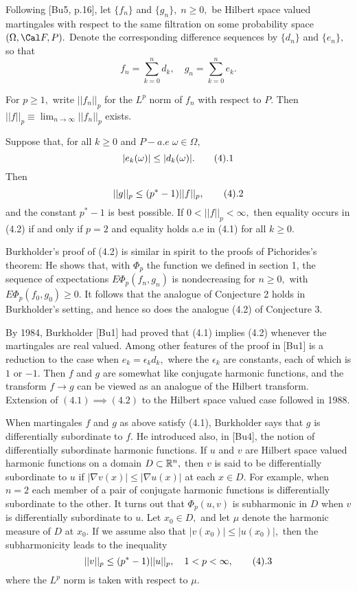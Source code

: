 Following [Bu5, p.16], let $\{f_n\}$ and $\{g_n\},\; n\geq 0,$ be Hilbert 
space valued martingales with respect to the same filtration on some 
probability space $(\Omega, \Cal F, P).$ Denote the corresponding difference 
sequences by $\{d_n\}$ and $\{e_n\},$ so  
that $$f_n = \sum_{k=0}^n d_k,\quad g_n = \sum_{k=0}^n e_k.$$

For $p\geq 1,$ write $||f_n||_p$ for the $L^p$ norm of $f_n$ with respect to 
$P.$ Then $||f||_p \equiv \lim_{n\rightarrow \infty} ||f_n||_p $ exists.

  Suppose that, for all $k\geq 0$ and $P-
a.e \;\omega \in \Omega,$
$$|e_k(\omega)| \leq |d_k(\omega)|. \tag4.1$$
Then $$||g||_p \leq (p^* - 1) ||f||_p,\tag4.2$$ and the constant $p^* - 1$ is best 
possible. If $0<||f||_p < \infty,$ then equality occurs in (4.2) if and only 
if $p=2$ and equality holds a.e in (4.1) for all $k\geq 0.$ \endproclaim

Burkholder's proof of (4.2) is similar in spirit to the proofs of 
Pichorides's theorem: He shows that, with ${\Phi}_p$ the function we defined in 
section 1, the sequence of expectations $E \Phi_p(f_n,g_n)$ is nondecreasing 
for $n\geq 0,$ with
$E \Phi_p(f_0 ,g_0) \geq 0.$ It follows that the analogue of 
Conjecture 2 holds in Burkholder's setting, and hence so does the analogue 
(4.2) of Conjecture 3.

By 1984, Burkholder [Bu1] had proved that (4.1) implies (4.2) whenever the martingales 
are real valued. Among other features of the proof in [Bu1] is a reduction to 
the case when $e_k = {\epsilon}_k d_k,$  where the ${\epsilon}_k$ are 
constants, each of which is $1$ or $-1$. Then $f$ and $g$ are somewhat like 
conjugate harmonic functions, and the transform $f\rightarrow g$ can be 
viewed as an analogue of the Hilbert transform. Extension of $(4.1) \implies 
(4.2)$ to the Hilbert space valued case followed in 1988. 

When martingales $f$ and $g$ as above satisfy (4.1), Burkholder says that 
$g$ is differentially subordinate to $f.$ He introduced also, in [Bu4], 
the notion of differentially subordinate harmonic functions. If $u$ and $v$ 
are Hilbert  
space valued harmonic functions on a domain $D\subset {\Bbb R}^n,$ then $v$ is 
said to be differentially subordinate to $u$ if $|\nabla v(x)| \leq |\nabla 
u(x)|$ at each $x\in D.$ For example, when $n=2$ each member of a pair of 
conjugate harmonic functions is differentially subordinate to the other. 
It turns out that ${\Phi_p}(u,v)$ is 
subharmonic in $D$ when $v$ is differentially subordinate to $u.$ Let $x_0\in 
D,$ and let $\mu$ denote the harmonic measure of $D$ at $x_0.$ If we assume 
also that $|v(x_0)|\leq |u(x_0)|,$ then the subharmonicity leads to the 
inequality $$ ||v||_p \leq (p^* - 1)||u||_p, \quad 1<p<\infty,\tag4.3$$
where the $L^p$ norm is taken with respect to $\mu.$

